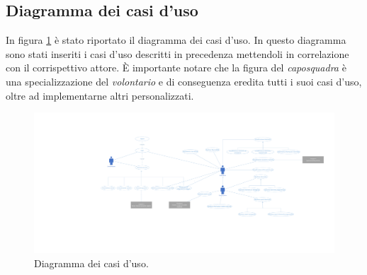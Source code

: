 \subsection{Diagramma dei casi d'uso}
In figura \ref{fig:UseCaseDiagram} è stato riportato il diagramma dei casi d'uso. In questo diagramma sono stati inseriti i casi d'uso descritti in precedenza mettendoli in correlazione con il corrispettivo attore. È importante notare che la figura del \textit{caposquadra} è una specializzazione del \textit{volontario} e di conseguenza eredita tutti i suoi casi d'uso, oltre ad implementarne altri personalizzati. 
\begin{landscape}
	\begin{figure}[b]
		\centering
		\includegraphics[width=1\linewidth]{./Iterazione 0/OtherFiles/Use cases diagram}
		\caption{Diagramma dei casi d'uso.}
		\label{fig:UseCaseDiagram}
	\end{figure}
\end{landscape}

